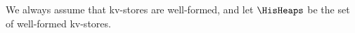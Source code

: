 We always assume that kv-stores are well-formed, and let $\HisHeaps$ be the set of well-formed kv-stores.

%
%
%
%
